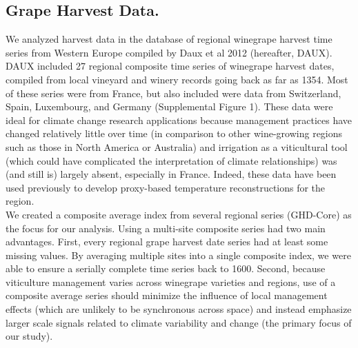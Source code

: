 \documentclass[final]{nature}
\begin{document}
\begin{methods}
\subsection{Grape Harvest Data.}
\noindent We analyzed harvest data in the database of regional winegrape harvest time series from Western Europe compiled by Daux et al 2012 (hereafter, DAUX\cite{Daux2012}). DAUX included 27 regional composite time series of winegrape harvest dates, compiled from local vineyard and winery records going back as far as 1354. Most of these series were from France, but also included were data from Switzerland, Spain, Luxembourg, and Germany (Supplemental Figure 1). These data were ideal for climate change research applications because management practices have changed relatively little over time (in comparison to other wine-growing regions such as those in North America or Australia) and irrigation as a viticultural tool (which could have complicated the interpretation of climate relationships) was (and still is) largely absent, especially in France. Indeed, these data have been used previously to develop proxy-based temperature reconstructions for the region\cite{Daux2012}.\\
\indent We created a composite average index from several regional series (GHD-Core) as the focus for our analysis. Using a multi-site composite series had two main advantages. First, every regional grape harvest date series had at least some missing values. By averaging multiple sites into a single composite index, we were able to ensure a serially complete time series back to 1600. Second, because viticulture management varies across winegrape varieties and regions, use of a composite average series should minimize the influence of local management effects (which are unlikely to be synchronous across space) and instead emphasize larger scale signals related to climate variability and change (the primary focus of our study).\\

\end{methods}
\end{document}
